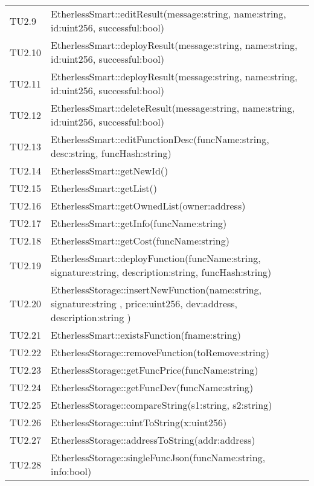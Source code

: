 \begin{longtable}{
		>{\centering}p{}
		>{}p{}}
	TU2.9  &  EtherlessSmart::editResult(message:string, name:string, id:uint256, successful:bool)  \tabularnewline
	
	TU2.10 &  EtherlessSmart::deployResult(message:string, name:string, id:uint256, successful:bool)  \tabularnewline
	
	TU2.11 &  EtherlessSmart::deployResult(message:string, name:string, id:uint256, successful:bool)  \tabularnewline
	
	TU2.12 &  EtherlessSmart::deleteResult(message:string, name:string, id:uint256, successful:bool)  \tabularnewline
	
	TU2.13 &  EtherlessSmart::editFunctionDesc(funcName:string, desc:string, funcHash:string)  \tabularnewline
	
	TU2.14 &  EtherlessSmart::getNewId()  \tabularnewline
	
	TU2.15 &  EtherlessSmart::getList()  \tabularnewline
	
	TU2.16 &  EtherlessSmart::getOwnedList(owner:address)  \tabularnewline
	
	TU2.17 &  EtherlessSmart::getInfo(funcName:string)  \tabularnewline
	
	TU2.18 &  EtherlessSmart::getCost(funcName:string)  \tabularnewline
	
	TU2.19 &  EtherlessSmart::deployFunction(funcName:string, signature:string, description:string, funcHash:string)  \tabularnewline
	
	TU2.20 &  EtherlessStorage::insertNewFunction(name:string, signature:string , price:uint256, dev:address, description:string )  \tabularnewline
	
	TU2.21 &  EtherlessSmart::existsFunction(fname:string)  \tabularnewline
	
	TU2.22 &  EtherlessStorage::removeFunction(toRemove:string)  \tabularnewline
	
	TU2.23 &  EtherlessStorage::getFuncPrice(funcName:string)  \tabularnewline
	
	TU2.24 &  EtherlessStorage::getFuncDev(funcName:string)  \tabularnewline
	
	TU2.25 &  EtherlessStorage::compareString(s1:string, s2:string)  \tabularnewline
	
	TU2.26 &  EtherlessStorage::uintToString(x:uint256)  \tabularnewline
	
	TU2.27 &  EtherlessStorage::addressToString(addr:address)  \tabularnewline
	
	TU2.28 &  EtherlessStorage::singleFuncJson(funcName:string, info:bool)  \tabularnewline
	

\end{longtable}
